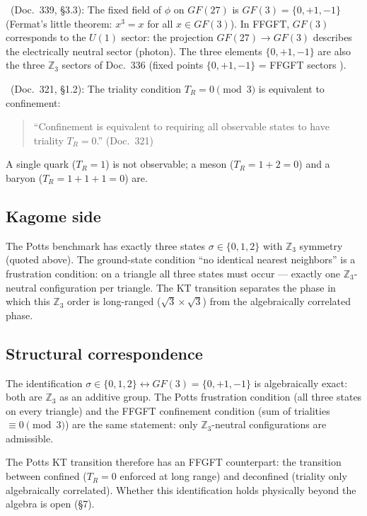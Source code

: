 \BM\ (Doc.~339, §3.3): The fixed field of $\phi$ on $GF(27)$ is
$GF(3)=\{0,+1,-1\}$ (Fermat's little theorem: $x^3=x$ for all $x\in GF(3)$).
In FFGFT, $GF(3)$ corresponds to the $U(1)$ sector: the projection
$GF(27)\to GF(3)$ describes the electrically neutral sector (photon). The
three elements $\{0,+1,-1\}$ are also the three $\mathbb{Z}_3$ sectors of
Doc.~336 (fixed points $\{0,+1,-1\}$ = FFGFT sectors \BM).

\BM\ (Doc.~321, §1.2): The triality condition $T_R=0\pmod{3}$ is equivalent
to confinement:
\begin{quote}
``Confinement is equivalent to requiring all observable states to have
triality $T_R=0$.'' (Doc.~321)
\end{quote}
A single quark ($T_R=1$) is not observable; a meson ($T_R=1+2=0$) and a
baryon ($T_R=1+1+1=0$) are.

\subsection{Kagome side}

The Potts benchmark has exactly three states $\sigma\in\{0,1,2\}$ with
$\mathbb{Z}_3$ symmetry (quoted above). The ground-state condition ``no
identical nearest neighbors'' is a frustration condition: on a triangle all
three states must occur --- exactly one $\mathbb{Z}_3$-neutral configuration
per triangle. The KT transition separates the phase in which this
$\mathbb{Z}_3$ order is long-ranged ($\sqrt{3}\times\sqrt{3}$) from the
algebraically correlated phase.

\subsection{Structural correspondence}

The identification $\sigma\in\{0,1,2\}\leftrightarrow GF(3)=\{0,+1,-1\}$ is
algebraically exact: both are $\mathbb{Z}_3$ as an additive group. The Potts
frustration condition (all three states on every triangle) and the FFGFT
confinement condition (sum of trialities $\equiv0\pmod{3}$) are the same
statement: only $\mathbb{Z}_3$-neutral configurations are admissible. \SM

The Potts KT transition therefore has an FFGFT counterpart: the transition
between confined ($T_R=0$ enforced at long range) and deconfined (triality
only algebraically correlated). Whether this identification holds
physically beyond the algebra is open (§7).

